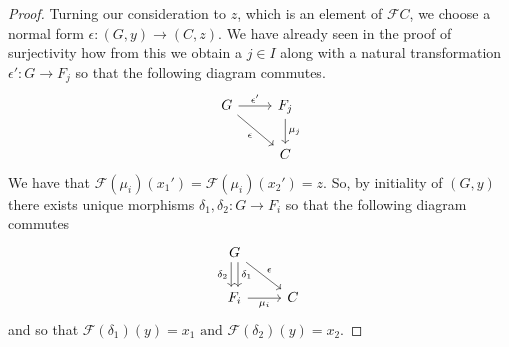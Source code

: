 \documentclass[12pt]{article}
\theoremstyle{plain}
\theoremstyle{definition}
\newcommand{\scr}[1]{\mathscr{#1}}
\newcommand{\lto}{\longrightarrow}
\begin{document}
\begin{proof}
		Turning our consideration to $z$, which is an element of $\scr{F}C$, we choose a normal form $\epsilon: (G, y) \lto (C, z)$. We have already seen in the proof of surjectivity how from this we obtain a $j \in I$ along with a natural transformation $\epsilon': G \lto F_j$ so that the following diagram commutes.
		\begin{equation}\label{eq:by_finiteness}
			\begin{tikzcd}
				G\arrow[r,"{\epsilon'}"]\arrow[dr,swap,"{\epsilon}"] & F_j\arrow[d,"{\mu_j}"]\\
				& C
				\end{tikzcd}
			\end{equation}
		We have that $\scr{F}(\mu_i)(x_1') = \scr{F}(\mu_i)(x_2') = z$. So, by initiality of $(G,y)$ there exists unique morphisms $\delta_1,\delta_2: G \lto F_i$ so that the following diagram commutes
		\begin{equation}\label{eq:by_normality}
		\begin{tikzcd}
			G\arrow[dr,"{\epsilon}"]\arrow[d,swap, shift right, "{\delta_2}"]\arrow[d,shift left, "{\delta_1}"]\\
			F_i\arrow[r,swap,"{\mu_i}"] & C
			\end{tikzcd}
		\end{equation}
		and so that $
			\scr{F}(\delta_1)(y) = x_1\text{ and }\scr{F}(\delta_2)(y) = x_2$.
		

\end{proof}
\end{document}
